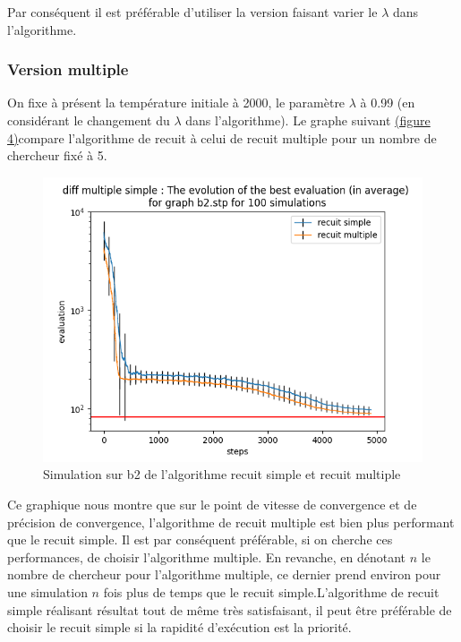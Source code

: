 \documentclass[11pt,french]{report}
\begin{document}
        Par conséquent il est préférable d'utiliser la version faisant varier le $\lambda$ dans l'algorithme.

        \subsubsection{Version multiple}
        On fixe à présent la température initiale à 2000, le paramètre $\lambda$ à 0.99 (en considérant le changement du $\lambda$ dans l'algorithme).
        Le graphe suivant \hyperref[Figure4]{(figure 4)}compare l'algorithme de recuit à celui de recuit multiple pour un nombre de chercheur fixé à 5.
        \begin{figure}
        	\begin{center}
        		\includegraphics[width=1\textwidth]{best_b2_evaluation_diff multiple simple.png}
        	\end{center}
        	\caption{Simulation sur b2 de l'algorithme recuit simple et recuit multiple}
        	\label{Figure4}
        \end{figure}

        Ce graphique nous montre que sur le point de vitesse de convergence et de précision de convergence, l'algorithme de recuit multiple est bien plus performant que le recuit simple. Il est par conséquent préférable, si on cherche ces performances, de choisir l'algorithme multiple. En revanche, en dénotant $n$ le nombre de chercheur pour l'algorithme multiple, ce dernier prend environ pour une simulation $n$ fois plus de temps que le recuit simple.L'algorithme de recuit simple réalisant résultat tout de même très satisfaisant, il peut être préférable de choisir le recuit simple si la rapidité d'exécution est la priorité.
\end{document}
